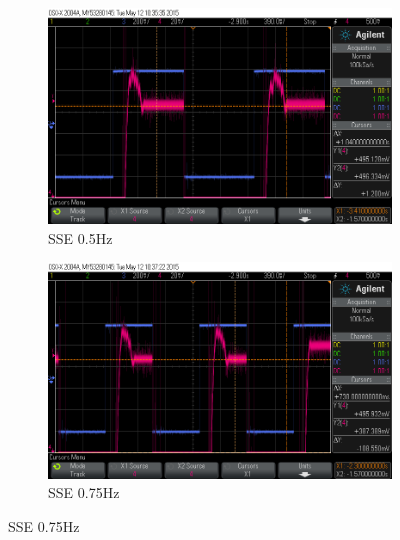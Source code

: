 \documentclass[11pt,a4paper]{article}
\begin{document}
\begin{enumerate}
\begin{figure}[H]
  \begin{subfigure}{0.5\textwidth}
  \includegraphics[width=0.95\linewidth]{Oscilloscope/PartD_0_5Hz_SSE.png}
  \caption{SSE 0.5Hz}
  \label{fig:subim2}
  \end{subfigure}	  
  \begin{subfigure}{0.5\textwidth}
  \includegraphics[width=0.95\linewidth]{Oscilloscope/PartD_0_75Hz_SSE.png}
  \caption{SSE 0.75Hz}
  \label{fig:subim2}
  \end{subfigure}
 

\end{figure}
\end{enumerate}
\end{document}
